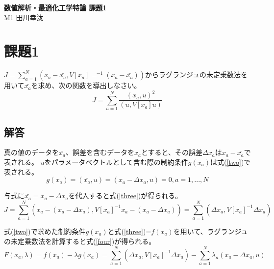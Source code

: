 \documentclass[]{jarticle}          %
\begin{document}

\vspace*{2ex}
\begin{center}
 {\Large \bf 数値解析・最適化工学特論 課題1}\\ %
 \vspace*{5mm}
 {\large M1 田川幸汰}%
\end{center}



\section{課題1}
$J=\sum_{a=1}^{N}(x_a-\bar{x_a}, V[x_a]=^{-1}(x_a-\bar{x_a}))$からラグランジュの未定乗数法を用いて$\bar{x_a}$を求め、次の関数を導出しなさい。
\begin{equation}
  J = \sum_{a=1}^{N}\frac{(x_a,u)^2}{(u,V[x_a]u)}
\end{equation}

\subsection{解答}
真の値のデータを$\bar{x_a}$、誤差を含むデータを$x_a$とすると、その誤差$\Delta{x_a}$は$x_a-\bar{x_a}$で表される。
$u$をパラメータベクトルとして含む際の制約条件$g(x_a)$は式(\ref{two})で表される。
\begin{equation}
  g(x_a)=(\bar{x_a},u)=(x_a-\Delta{x_a},u)=0, a=1,...,N
  \label{two}
\end{equation}

与式に$\bar{x_a}=x_a-\Delta{x_a}$を代入すると式(\ref{three})が得られる。
\begin{equation}
  J = \sum_{a=1}^{N}(x_a-(x_a-\Delta{x_a}),V[x_a]^{-1}x_a-(x_a-\Delta{x_a}))=\sum_{a=1}^{N}(\Delta{x_a},V[x_a]^{-1}\Delta{x_a})
  \label{three}
\end{equation}

式(\ref{two})で求めた制約条件$g(x_a)$と式(\ref{three})=$f(x_a)$を用いて、ラグランジュの未定乗数法を計算すると式(\ref{four})が得られる。
\begin{equation}
  F(x_a,\lambda)=f(x_a)-\lambda{g(x_a)}=\sum_{a=1}^{N}(\Delta{x_a},V[x_a]^{-1}\Delta{x_a})-\sum_{a=1}^{N}\lambda_a(x_a-\Delta{x_a},u)
  \label{four}
\end{equation}
\end{document}
